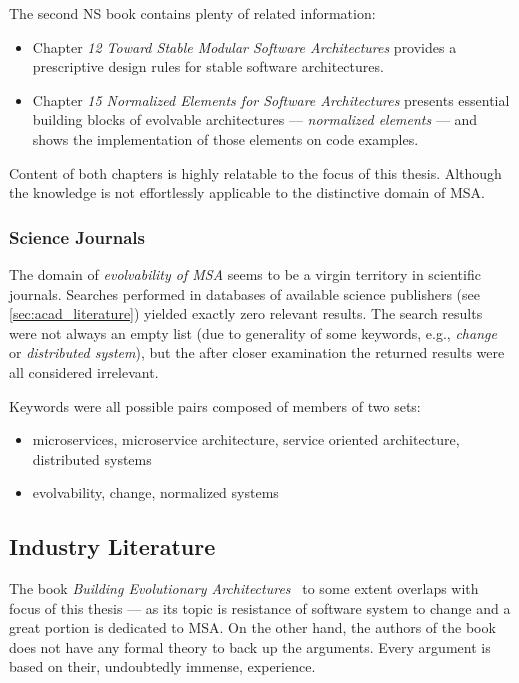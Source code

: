 \documentclass[thesis=M,english,hidelinks]{FITthesis}[2012/10/20]
\begin{document}
The second \acrshort{NS} book \cite{ns-toward-general-theory} contains plenty of related information:
\begin{itemize}
    \item Chapter \textit{12 Toward Stable Modular Software Architectures} provides a prescriptive design rules for stable software architectures.
    \item Chapter \textit{15 Normalized Elements for Software Architectures} presents essential building blocks of evolvable architectures --- \textit{normalized elements} --- and shows the implementation of those elements on code examples.
\end{itemize}

Content of both chapters is highly relatable to the focus of this thesis. Although the knowledge is not effortlessly applicable to the distinctive domain of \acrlong{MSA}.

\subsubsection*{Science Journals}
The domain of \textit{evolvability of \acrlong{MSA}} seems to be a virgin territory in scientific journals. Searches performed in databases of available science publishers (see \ref{sec:acad_literature}) yielded exactly zero relevant results. The search results were not always an empty list (due to generality of some keywords, e.g., \textit{change} or \textit{distributed system}), but the after closer examination the returned results were all considered irrelevant.

Keywords were all possible pairs composed of members of two sets:
\begin{itemize}
    \item microservices, microservice architecture, service oriented architecture, distributed systems
    \item evolvability, change, normalized systems
\end{itemize}

\subsection{Industry Literature}
The book \textit{Building Evolutionary Architectures}~\cite{ms-evolutionary-arch} to some extent overlaps with focus of this thesis --- as its topic is resistance of software system to change and a great portion is dedicated to \acrlong{MSA}. On the other hand, the authors of the book does not have any formal theory to back up the arguments. Every argument is based on their, undoubtedly immense, experience. 
\end{document}
